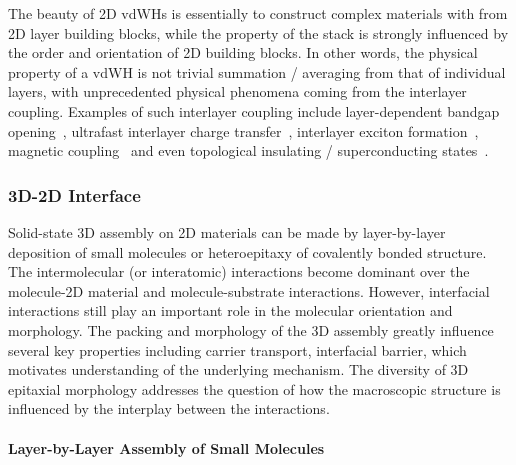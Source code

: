 The beauty of 2D vdWHs is essentially to construct complex materials
with from 2D layer building blocks, while the property of the stack is
strongly influenced by the order and orientation of 2D building
blocks.
%
In other words, the physical property of a vdWH is not trivial
summation / averaging from that of individual layers, with
unprecedented physical phenomena coming from the interlayer coupling.
%
Examples of such interlayer coupling include layer-dependent bandgap
opening~\cite{Mak_2010_mos2,Raja_2017}, ultra\-fast interlayer charge
transfer~\cite{Hong_2014_ultrafast_e_MoS2WS2,Zheng_2017}, interlayer
exciton formation~\cite{Latini_2017_interlayer_ex}, magnetic
coupling~\cite{Huang_2017_magnet} and even topological insulating /
superconducting states~\cite{Cao_2018_insulator,Cao_2018_supercond}.


\subsubsection{3D-2D Interface}
\label{sec:intro-3D-2D}

Solid-state 3D assembly on 2D materials can be made by layer-by-layer
deposition of small molecules or hetero\-epitaxy of covalently bonded
structure. The intermolecular (or interatomic) interactions become
dominant over the molecule-2D material and molecule-substrate
interactions. However, interfacial interactions still play an
important role in the molecular orientation and morphology. The
packing and morphology of the 3D assembly greatly influence several
key properties including carrier transport, interfacial barrier, which
motivates understanding of the underlying mechanism.  The diversity of
3D epitaxial morphology addresses the question of how the macroscopic
structure is influenced by the interplay between the interactions.


\paragraph{Layer-by-Layer Assembly of Small Molecules}
\label{sec:org2cdd8f0}

